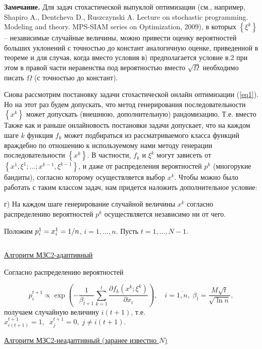 \textbf{Замечание.} Для задач стохастической выпуклой оптимизации (см., 
например, Shapiro A., Dentcheva D., Ruszczynski A. Lecture on stochastic programming. Modeling and theory. MPS-SIAM series on Optimization, 2009), в которых $\left\{ {\xi ^k} \right\}$ -- 
независимые случайные величины, можно привести оценку вероятностей больших 
уклонений с точностью до констант аналогичную оценке, приведенной в теореме 
и для случая, когда вместо условия в) предполагается условие в.2 при этом в 
правой части неравенства под вероятностью вместо $\sqrt \Omega $ необходимо 
писать $\Omega $ (с точностью до констант).

Снова рассмотрим постановку задачи стохастической онлайн оптимизации (\ref{eq1}). Но на этот раз будем допускать, что метод генерирования последовательности 
$\left\{ {x^k} \right\}$ может допускать (внешнюю, дополнительную) 
рандомизацию. Т.е.  вместо   Также как и раньше онлайновость постановки задачи допускает, 
что на каждом шаге $k$ функция $f_k $ может подбираться из рассматриваемого 
класса функций враждебно по отношению к используемому нами методу генерации 
последовательности $\left\{ {x^k} \right\}$. В частности, $f_k $ и $\xi ^k$ 
могут зависеть от $\left\{ {x^1,\xi ^1;...;x^{k-1},\xi ^{k-1}} \right\}$, и 
даже от распределения вероятностей $p^k$ (многорукие бандиты), согласно 
которому осуществляется выбор $x^k$. Чтобы можно было работать с таким 
классом задач, нам придется наложить дополнительное условие:


г) На каждом шаге генерирование случайной величины $x^k$ согласно распределению вероятностей $p^k$ осуществляется независимо ни от чего.

Положим $p_i^1 =x_i^1 =1 \mathord{\left/ {\vphantom {1 n}} \right. 
\kern-\nulldelimiterspace} n$, $i=1,...,n$. Пусть $t=1,...,N-1$.

$ $

\underline {Алгоритм МЗС2-адаптивный}

\noindent Согласно распределению вероятностей

\[
p_i^{t+1} \propto \exp \left( {-\frac{1}{\beta _{t+1} }\sum\limits_{k=1}^t 
{\frac{\partial f_k \left( {x^k;\xi ^k} \right)}{\partial x_i }} } 
\right), \quad i=\overline{1,n},\;
\beta _t =\frac{M\sqrt t }{\sqrt {\ln n} },
\]
получаем случайную величину 
$i\left( {t+1} \right)$, т.е. \\ $x_{i\left( {t+1} \right)}^{t+1} =1,\;\;x_j^{t+1} 
=0,\;j\ne i\left( {t+1} \right).$



\underline {Алгоритм МЗС2-неадаптивный (заранее известно $N$)}

